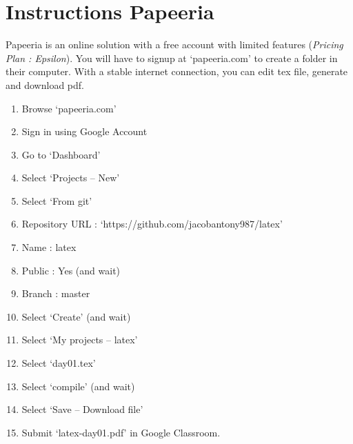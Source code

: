 \documentclass{article}
\begin{document}
\section{Instructions Papeeria}
	Papeeria is an online solution with a free account with limited features (\textit{Pricing Plan : Epsilon}).
	You will have to signup at `papeeria.com' to create a folder in their computer.
	With a stable internet connection, you can edit tex file, generate and download pdf.
	\begin{enumerate}
		\item Browse `papeeria.com'
		\item Sign in using Google Account
		\item Go to `Dashboard'
		\item Select `Projects -- New'
		\item Select `From git'
		\item Repository URL : `https://github.com/jacobantony987/latex'
		\item Name : latex
		\item Public : Yes (and wait)
		\item Branch : master
		\item Select `Create' (and wait)
		\item Select `My projects -- latex'
		\item Select `day01.tex'
		\item Select `compile' (and wait)
		\item Select `Save -- Download file'
		\item Submit `latex-day01.pdf' in Google Classroom.
	\end{enumerate}
\end{document}
